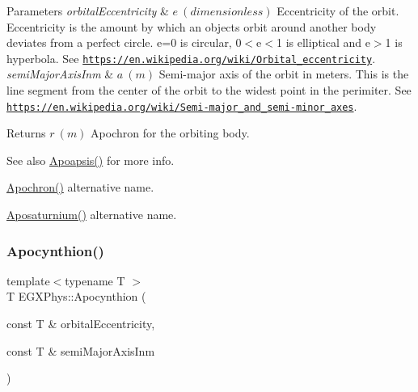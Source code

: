 \begin{DoxyParams}{Parameters}
{\em orbital\+Eccentricity} & $ e\ (dimensionless)$ Eccentricity of the orbit. Eccentricity is the amount by which an objects orbit around another body deviates from a perfect circle. e=0 is circular, 0$<$e$<$1 is elliptical and e$>$1 is hyperbola. See \href{https://en.wikipedia.org/wiki/Orbital_eccentricity}{\tt https\+://en.\+wikipedia.\+org/wiki/\+Orbital\+\_\+eccentricity}. \\
\hline
{\em semi\+Major\+Axis\+Inm} & $ a\ (m)$ Semi-\/major axis of the orbit in meters. This is the line segment from the center of the orbit to the widest point in the perimiter. See \href{https://en.wikipedia.org/wiki/Semi-major_and_semi-minor_axes}{\tt https\+://en.\+wikipedia.\+org/wiki/\+Semi-\/major\+\_\+and\+\_\+semi-\/minor\+\_\+axes}. \\
\hline
\end{DoxyParams}
\begin{DoxyReturn}{Returns}
$ r\ (m)$ Apochron for the orbiting body. 
\end{DoxyReturn}
\begin{DoxySeeAlso}{See also}
\mbox{\hyperlink{group___e_g_x_phys-_apoapsis_gafd08a2d1d64886e7bb9bcb7ff65bc3ea}{Apoapsis()}} for more info. 

\mbox{\hyperlink{group___e_g_x_phys-_apoapsis_gac978de20a08121198f73637018c80eee}{Apochron()}} alternative name. 

\mbox{\hyperlink{group___e_g_x_phys-_apoapsis_gabb69067baa611c8bda701d7040cc47b6}{Aposaturnium()}} alternative name. 
\end{DoxySeeAlso}
\mbox{\label{group___e_g_x_phys-_apoapsis_ga44b6d3e3280b5a59e1cfb53b65673075}} 
\subsubsection{\texorpdfstring{Apocynthion()}{Apocynthion()}}
{\footnotesize\ttfamily template$<$typename T $>$ \\
T E\+G\+X\+Phys\+::\+Apocynthion (\begin{DoxyParamCaption}\item[{const T \&}]{orbital\+Eccentricity,  }\item[{const T \&}]{semi\+Major\+Axis\+Inm }\end{DoxyParamCaption})}



